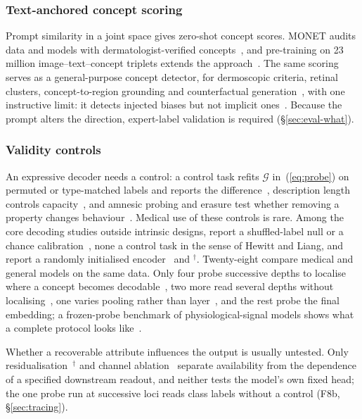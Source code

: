 \subsubsection{Text-anchored concept scoring}

Prompt similarity in a joint space gives zero-shot concept scores. MONET audits data and models with
dermatologist-verified concepts~\cite{kim2024transparent}, and pre-training on 23 million
image--text--concept triplets extends the approach~\cite{nie2025explainable}. The same scoring serves as
a general-purpose concept detector, for dermoscopic criteria, retinal clusters, concept-to-region
grounding and counterfactual
generation~\cite{patricio2023conceptbased,mensah2026interpretable,luo2025xbench,sadashivaiah2024explaining},
with one instructive limit: it detects injected biases but not implicit
ones~\cite{bertolini2025strengths}. Because the prompt alters the direction, expert-label validation is
required (\S\ref{sec:eval-what}).

\subsubsection{Validity controls}

An expressive decoder needs a control: a control task refits $\mathcal G$ in~(\ref{eq:probe}) on
permuted or type-matched labels and reports the difference~\cite{hewitt2019designing}, description
length controls capacity~\cite{voita2020information}, and amnesic probing and erasure test whether
removing a property changes
behaviour~\cite{elazar2020amnesic,ravfogel2020null,belrose2023leace,pimentel2020informationtheoretic,guerner2023geometric}.
Medical use of these controls is rare. Among the \Ndecni{} core decoding studies outside intrinsic
designs, \Nprobectrl{} report a shuffled-label null or a chance
calibration~\cite{liang2026cheap,rahbar2026frozen,vig2026do,bertolini2025strengths,arasteh2026candor,steiner2026when,li2026acquisition,cajas2026shortkit},
none a control task in the sense of Hewitt and Liang, and \Nproberand{} report a randomly initialised
encoder~\cite{rahbar2026frozen,arasteh2026candor,svatko2026deep,farquhar2026pretraining} and
\cite{tariq2024self}$^{\dagger}$. Twenty-eight compare medical and general models on the same data.
Only four probe successive depths to localise where a concept becomes
decodable~\cite{pedersen2026look,rahbar2026frozen,vig2026do,vadori2025mind}, two more read several
depths without localising~\cite{farquhar2026pretraining,demir2025downstream}, one varies pooling rather
than layer~\cite{muthyala2026frozen}, and the rest probe the final embedding; a frozen-probe benchmark
of physiological-signal models shows what a complete protocol looks like~\cite{zare2026eeg}.

Whether a recoverable attribute influences the output is usually untested. Only
residualisation~\cite{kim2026encoding}$^{\dagger}$ and channel ablation~\cite{nooralahzadeh2026sparse}
separate availability from the dependence of a specified downstream readout, and neither tests the
model's own fixed head; the one probe run at successive loci reads class labels without a control
(F8b, \S\ref{sec:tracing}).
